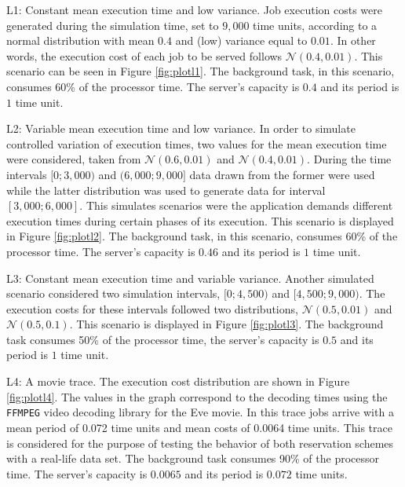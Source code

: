 \documentclass[times, 10pt,twocolumn]{article}
\begin{document}
\begin{description}
\item L1: Constant mean execution time and low variance. Job execution
  costs were generated during the simulation time, set to $9,000$ time
  units, according to a normal distribution with mean $0.4$ and (low)
  variance equal to $0.01$. In other words, the execution cost of each
  job to be served follows $\mathcal{N}(0.4,0.01)$. This scenario can
  be seen in Figure \ref{fig:plotl1}. The background task, in this
  scenario, consumes 60\% of the processor time. The server's capacity
  is $0.4$ and its period is $1$ time unit.
\item L2: Variable mean execution time and low variance.  In order to
  simulate controlled variation of execution times, two values for the
  mean execution time were considered, taken from
  $\mathcal{N}(0.6,0.01)$ and $\mathcal{N}(0.4,0.01)$. During the time
  intervals $[0;3,000)$ and $(6,000;9,000]$ data drawn from the former
  were used while the latter distribution was used to generate data
  for interval $[3,000;6,000]$. This simulates scenarios were the
  application demands different execution times during certain phases
  of its execution. This scenario is displayed in Figure
  \ref{fig:plotl2}. The background task, in this scenario, consumes
  60\% of the processor time. The server's capacity is $0.46$ and its
  period is $1$ time unit.
\item L3: Constant mean execution time and variable variance.  Another
  simulated scenario considered two simulation intervals, $[0;4,500)$
  and $[4,500;9,000)$.  The execution costs for these intervals
  followed two distributions, $\mathcal{N}(0.5,0.01)$ and
  $\mathcal{N}(0.5,0.1)$. This scenario is displayed in Figure
  \ref{fig:plotl3}. The background task consumes 50\% of the processor
  time, the server's capacity is $0.5$ and its period is $1$ time unit.
\item L4: A movie trace. The execution cost distribution are shown in
  Figure \ref{fig:plotl4}. The values in the graph correspond to the
  decoding times using the \texttt{FFMPEG} video decoding library for
  the Eve movie. In this trace jobs arrive with a mean period of 0.072
  time units and mean costs of 0.0064 time units. This trace is
  considered for the purpose of testing the behavior of both
  reservation schemes with a real-life data set. The background task
  consumes 90\% of the processor time. The server's capacity is
  $0.0065$ and its period is $0.072$ time units.
\end{description}
\end{document}
